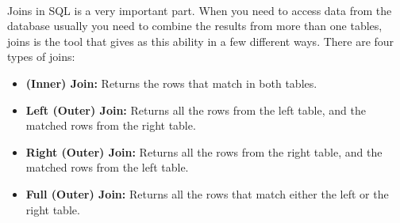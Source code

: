 \paragraph{} Joins in \acs{SQL} is a very important part. When you need to access data from the database usually you need to combine the results from more than one tables, joins is the tool that gives as this ability in a few different ways. There are four types of joins:
\begin{itemize}
	\item \textbf{(Inner) Join:} Returns the rows that match in both tables.
	\item \textbf{Left (Outer) Join:} Returns all the rows from the left table, and the matched rows from the right table.
	\item \textbf{Right (Outer) Join:} Returns all the rows from the right table, and the matched rows from the left table.
	\item \textbf{Full (Outer) Join:} Returns all the rows that match either the left or the right table.
\end{itemize}
\begin{figure}[h]
	\centering
\end{figure}
